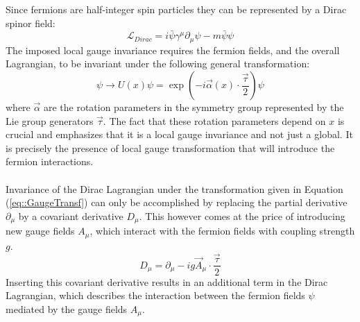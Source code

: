 Since fermions are half-integer spin particles they can be represented by a Dirac spinor field:
\begin{equation} \label{eq::DiracL}
 \mathcal{L}_{Dirac} = i \bar{\psi} \gamma^{\mu} \partial_{\mu} \psi - m \bar{\psi} \psi
\end{equation}
The imposed local gauge invariance requires the fermion fields, and the overall Lagrangian, to be invariant under the following general transformation:
\begin{equation} \label{eq::GaugeTransf}
 \psi \rightarrow U(x) \psi =  \exp \left( -i \vec{\alpha}(x) \cdot \frac{\vec{\tau}}{2} \right) \psi
\end{equation}
where $\vec{\alpha}$ are the rotation parameters in the symmetry group represented by the Lie group generators $\vec{\tau}$. The fact that these rotation parameters depend on $x$ is crucial and emphasizes that it is a local gauge invariance and not just a global. It is precisely the presence of local gauge transformation that will introduce the fermion interactions.
\\
\\
Invariance of the Dirac Lagrangian under the transformation given in Equation (\ref{eq::GaugeTransf}) can only be accomplished by replacing the partial derivative $\partial_{\mu}$ by a covariant derivative $D_{\mu}$. This however comes at the price of introducing new gauge fields $A_{\mu}$, which interact with the fermion fields with coupling strength $g$.
\begin{equation} \label{eq::CovDer}
 D_{\mu} = \partial_{\mu} -i g \vec{A}_{\mu} \cdot \frac{\vec{\tau}}{2}
\end{equation}
Inserting this covariant derivative results in an additional term in the Dirac Lagrangian, which describes the interaction between the fermion fields $\psi$ mediated by the gauge fields $A_{\mu}$. 
